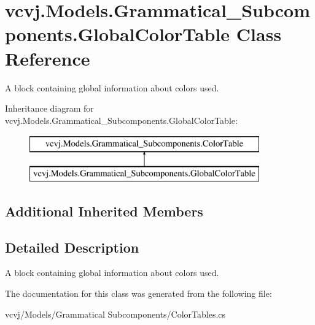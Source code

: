 \hypertarget{classvcvj_1_1_models_1_1_grammatical___subcomponents_1_1_global_color_table}{}\section{vcvj.\+Models.\+Grammatical\+\_\+\+Subcomponents.\+Global\+Color\+Table Class Reference}
\label{classvcvj_1_1_models_1_1_grammatical___subcomponents_1_1_global_color_table}


A block containing global information about colors used.  


Inheritance diagram for vcvj.\+Models.\+Grammatical\+\_\+\+Subcomponents.\+Global\+Color\+Table\+:\begin{figure}[H]
\begin{center}
\leavevmode
\includegraphics[height=2.000000cm]{classvcvj_1_1_models_1_1_grammatical___subcomponents_1_1_global_color_table}
\end{center}
\end{figure}
\subsection*{Additional Inherited Members}


\subsection{Detailed Description}
A block containing global information about colors used. 



The documentation for this class was generated from the following file\+:\begin{DoxyCompactItemize}
\item 
vcvj/\+Models/\+Grammatical Subcomponents/Color\+Tables.\+cs\end{DoxyCompactItemize}
